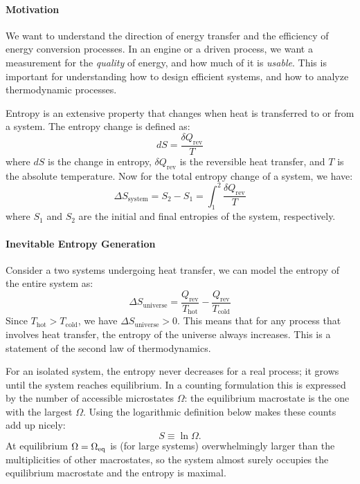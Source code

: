 \documentclass[11pt]{report}
\begin{document}
\paragraph{Motivation} We want to understand the direction of energy transfer and the efficiency of energy conversion processes. In an engine or a driven process, we want a measurement for the \textit{quality} of energy, and how much of it is \textit{usable}. This is important for understanding how to design efficient systems, and how to analyze thermodynamic processes.
\begin{definition}[Entropy]
    Entropy is an extensive property that changes when heat is transferred to or from a system. The entropy change is defined as:
    \begin{equation}
        dS = \frac{\delta Q_{\text{rev}}}{T}
    \end{equation}
    where $dS$ is the change in entropy, $\delta Q_{\text{rev}}$ is the reversible heat transfer, and $T$ is the absolute temperature. 
    Now for the total entropy change of a system, we have:
    \begin{equation}
        \Delta S_{\text{system}} = S_2 - S_1 = \int_{1}^{2} \frac{\delta Q_{\text{rev}}}{T}
    \end{equation}
    where $S_1$ and $S_2$ are the initial and final entropies of the system, respectively.
\end{definition}

\paragraph{Inevitable Entropy Generation} Consider a two systems undergoing heat transfer, we can model the entropy of the entire system as:
$$
    \Delta S_{\text{universe}} = \frac{Q_{\text{rev}}}{T_{\text{hot}}} - \frac{Q_{\text{rev}}}{T_{\text{cold}}}
$$
Since $T_{\text{hot}} > T_{\text{cold}}$, we have $\Delta S_{\text{universe}} > 0$. This means that for any process that involves heat transfer, the entropy of the universe always increases. This is a statement of the second law of thermodynamics.

\begin{theorem}
    For an isolated system, the entropy never decreases for a real process; it grows until the system reaches equilibrium. In a counting formulation this is expressed by the number of accessible microstates \(\Omega\): the equilibrium macrostate is the one with the largest \(\Omega\). Using the logarithmic definition below makes these counts add up nicely:
    \begin{equation}
        S \equiv \ln \Omega .
    \end{equation}
    At equilibrium \(\Omega=\Omega_{\rm eq}\) is (for large systems) overwhelmingly larger than the multiplicities of other macrostates, so the system almost surely occupies the equilibrium macrostate and the entropy is maximal.
\end{theorem}
\end{document}
